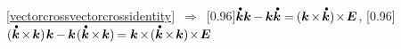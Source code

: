 \begin{otherlanguage}{russian}
\noindent \eqref{vectorcrossvectorcrossidentity} $\,\Rightarrow\,$
\scalebox{0.95}[0.96]{$\mathdotabove{\bm{k}} \bm{k} \hspace{-0.1ex} - \hspace{-0.1ex} \bm{k} \mathdotabove{\bm{k}} = \hspace{-0.16ex} ( \bm{k} \hspace{-0.2ex} \times \hspace{-0.24ex} \mathdotabove{\bm{k}} ) \hspace{-0.32ex} \times \hspace{-0.32ex} \bm{E}$},\hspace{.4ex}
%
\scalebox{0.95}[0.96]{${\displaystyle ( \mathdotabove{\bm{k}} \hspace{-0.2ex}\times\hspace{-0.24ex} \bm{k} ) \hspace{.2ex} \bm{k} \hspace{-0.1ex} - \hspace{-0.1ex} \bm{k} \hspace{.16ex} ( \mathdotabove{\bm{k}} \hspace{-0.2ex}\times\hspace{-0.24ex} \bm{k} ) \hspace{-0.16ex} = \bm{k} \hspace{-0.2ex} \times \hspace{-0.32ex} ( \mathdotabove{\bm{k}} \hspace{-0.2ex}\times\hspace{-0.24ex} \bm{k} ) \hspace{-0.32ex} \times \hspace{-0.32ex} \bm{E}}$\hspace{.16ex}}


\end{otherlanguage}
